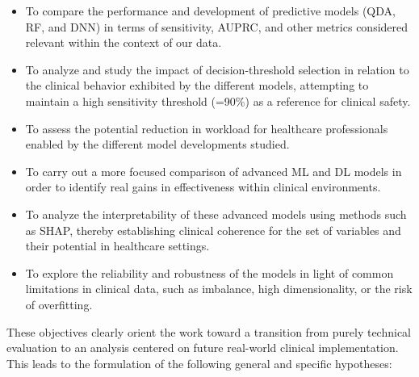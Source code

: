 \documentclass[12pt,onecolumn]{article}
\begin{document}
\begin{itemize}
    \item To compare the performance and development of predictive models (QDA, RF, and DNN) in terms of sensitivity, AUPRC, and other metrics considered relevant within the context of our data.
    \item To analyze and study the impact of decision-threshold selection in relation to the clinical behavior exhibited by the different models, attempting to maintain a high sensitivity threshold (=90\%) as a reference for clinical safety.
    \item To assess the potential reduction in workload for healthcare professionals enabled by the different model developments studied.
    \item To carry out a more focused comparison of advanced ML and DL models in order to identify real gains in effectiveness within clinical environments.
    \item To analyze the interpretability of these advanced models using methods such as SHAP, thereby establishing clinical coherence for the set of variables and their potential in healthcare settings.
    \item To explore the reliability and robustness of the models in light of common limitations in clinical data, such as imbalance, high dimensionality, or the risk of overfitting.
\end{itemize}

These objectives clearly orient the work toward a transition from purely technical evaluation to an analysis centered on future real-world clinical implementation. This leads to the formulation of the following general and specific hypotheses:
\end{document}

